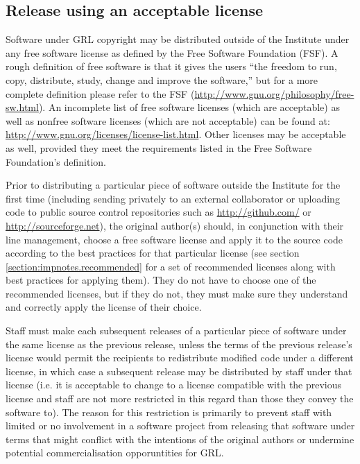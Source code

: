 \documentclass[10pt,a4paper]{article}
\begin{document}
\subsection{Release using an acceptable license}
\label{section:policy.licenses}
\par Software under GRL copyright may be distributed outside of 
the Institute under any free software license as defined by the Free 
Software Foundation (FSF). A rough definition of free software is that it gives 
the users ``the freedom to run, copy, distribute, study, change and improve 
the software,'' but for a more complete definition please refer to the FSF 
(\url{http://www.gnu.org/philosophy/free-sw.html}). An incomplete list of free 
software licenses (which are acceptable) as well as nonfree software licenses 
(which are not acceptable) can be found at: 
\url{http://www.gnu.org/licenses/license-list.html}. Other licenses may be 
acceptable as well, provided they meet the requirements listed in the Free 
Software Foundation's definition. 

\par Prior to distributing a particular piece of software outside the Institute for the 
first time (including sending privately to an external collaborator or uploading code 
to public source control repositories such as \url{http://github.com/} 
or \url{http://sourceforge.net}), the original author(s) should, in conjunction with their 
line management, choose a free software license and apply it to the source code 
according to the best practices for that particular license 
(see section \ref{section:impnotes.recommended} for a set of recommended 
licenses along with best practices for applying them). They do not have to choose 
one of the recommended licenses, but if they do not, they must make sure they 
understand and correctly apply the license of their choice. 

\par Staff must make each subsequent releases of a particular piece of software 
under the same license as the previous release, unless the terms of the previous 
release's license would permit the recipients to redistribute modified code under a 
different license, in which case a subsequent release may be distributed by staff 
under that license (i.e. it is acceptable to change to a license compatible with 
the previous license and staff are not more restricted in this regard than those 
they convey the software to). The reason for this restriction is primarily to prevent 
staff with limited or no involvement in a software project from releasing that 
software under terms that might conflict with the intentions of the original 
authors or undermine potential commercialisation opporuntities for GRL. 
\end{document}
